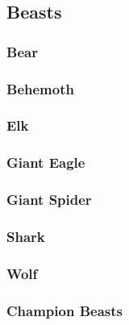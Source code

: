 \subsection{Beasts}
\begin{multicols}{2}
    \subsubsection*{Bear}\label{foe:bear}
    \subsubsection*{Behemoth}\label{foe:behemoth}
    \subsubsection*{Elk}\label{foe:elk}
    \subsubsection*{Giant Eagle}\label{foe:giant-eagle}
    \subsubsection*{Giant Spider}\label{foe:giant-spider}
    \subsubsection*{Shark}\label{foe:shark}
    \subsubsection*{Wolf}\label{foe:wolf}
\end{multicols}
\subsubsection{Champion Beasts}

